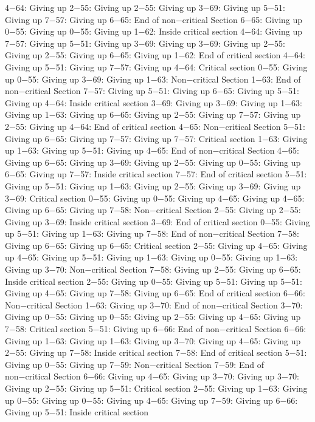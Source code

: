 4−64: Giving up
2−55: Giving up
2−55: Giving up
3−69: Giving up
5−51: Giving up
7−57: Giving up
6−65: End of non−critical Section
6−65: Giving up
0−55: Giving up
0−55: Giving up
1−62: Inside critical section
4−64: Giving up
7−57: Giving up
5−51: Giving up
3−69: Giving up
3−69: Giving up
2−55: Giving up
2−55: Giving up
6−65: Giving up
1−62: End of critical section
4−64: Giving up
5−51: Giving up
7−57: Giving up
4−64: Critical section
0−55: Giving up
0−55: Giving up
3−69: Giving up
1−63: Non−critical Section
1−63: End of non−critical Section
7−57: Giving up
5−51: Giving up
6−65: Giving up
5−51: Giving up
4−64: Inside critical section
3−69: Giving up
3−69: Giving up
1−63: Giving up
1−63: Giving up
6−65: Giving up
2−55: Giving up
7−57: Giving up
2−55: Giving up
4−64: End of critical section
4−65: Non−critical Section
5−51: Giving up
6−65: Giving up
7−57: Giving up
7−57: Critical section
1−63: Giving up
1−63: Giving up
5−51: Giving up
4−65: End of non−critical Section
4−65: Giving up
6−65: Giving up
3−69: Giving up
2−55: Giving up
0−55: Giving up
6−65: Giving up
7−57: Inside critical section
7−57: End of critical section
5−51: Giving up
5−51: Giving up
1−63: Giving up
2−55: Giving up
3−69: Giving up
3−69: Critical section
0−55: Giving up
0−55: Giving up
4−65: Giving up
4−65: Giving up
6−65: Giving up
7−58: Non−critical Section
2−55: Giving up
2−55: Giving up
3−69: Inside critical section
3−69: End of critical section
0−55: Giving up
5−51: Giving up
1−63: Giving up
7−58: End of non−critical Section
7−58: Giving up
6−65: Giving up
6−65: Critical section
2−55: Giving up
4−65: Giving up
4−65: Giving up
5−51: Giving up
1−63: Giving up
0−55: Giving up
1−63: Giving up
3−70: Non−critical Section
7−58: Giving up
2−55: Giving up
6−65: Inside critical section
2−55: Giving up
0−55: Giving up
5−51: Giving up
5−51: Giving up
4−65: Giving up
7−58: Giving up
6−65: End of critical section
6−66: Non−critical Section
1−63: Giving up
3−70: End of non−critical Section
3−70: Giving up
0−55: Giving up
0−55: Giving up
2−55: Giving up
4−65: Giving up
7−58: Critical section
5−51: Giving up
6−66: End of non−critical Section
6−66: Giving up
1−63: Giving up
1−63: Giving up
3−70: Giving up
4−65: Giving up
2−55: Giving up
7−58: Inside critical section
7−58: End of critical section
5−51: Giving up
0−55: Giving up
7−59: Non−critical Section
7−59: End of non−critical Section
6−66: Giving up
4−65: Giving up
3−70: Giving up
3−70: Giving up
2−55: Giving up
5−51: Critical section
2−55: Giving up
1−63: Giving up
0−55: Giving up
0−55: Giving up
4−65: Giving up
7−59: Giving up
6−66: Giving up
5−51: Inside critical section
